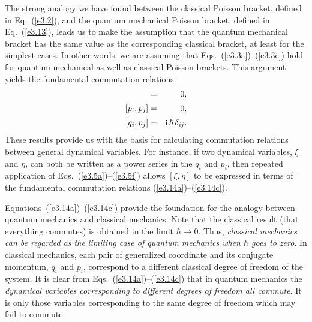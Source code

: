 The strong analogy we have found between the classical Poisson bracket, defined
in Eq.~(\ref{e3.2}), and the quantum mechanical 
Poisson bracket, defined in Eq.~(\ref{e3.13}), leads
us to make the assumption that the quantum mechanical bracket has the same
value as the corresponding classical bracket, at least for the simplest
cases. In other words, we are assuming that Eqs.~(\ref{e3.3a})--(\ref{e3.3c}) hold for quantum
mechanical as well as classical Poisson brackets. This argument yields the
fundamental commutation relations
\begin{eqnarray}
[q_i, q_j] &=& 0,\label{e3.14a}\\[0.5ex]
[p_i, p_j]&=& 0, \label{e3.14b}\\[0.5ex]
[q_i, p_j] &=& {\rm i} \,\hbar \,\delta_{ij}.\label{e3.14c}
\end{eqnarray}
These results provide us with the basis for calculating commutation
relations between general dynamical variables. For instance, if
two dynamical variables,  $\xi$ and $\eta$,
can both  be written as a power series in the
 $q_i$ and $p_i$, then repeated application of Eqs.~(\ref{e3.5a})--(\ref{e3.5f})
allows $[\xi, \eta]$ to be expressed in terms of the fundamental
commutation relations (\ref{e3.14a})--(\ref{e3.14c}). 

Equations~(\ref{e3.14a})--(\ref{e3.14c}) provide the foundation for the analogy between quantum mechanics
and classical mechanics. Note that the classical result (that everything commutes)
is obtained in the limit $\hbar\rightarrow 0$. Thus, {\em classical mechanics
can be regarded as the limiting case of quantum mechanics when
$\hbar$ goes to zero}. 
In classical mechanics, each 
pair of generalized coordinate and its conjugate momentum, $q_i$ and
$p_i$, correspond to a different classical degree of freedom of the system. 
It is clear from Eqs.~(\ref{e3.14a})--(\ref{e3.14c}) that in quantum mechanics the {\em dynamical
variables corresponding to different degrees of freedom all commute}. 
It is only those variables corresponding to the same degree of freedom which
may fail to commute.

